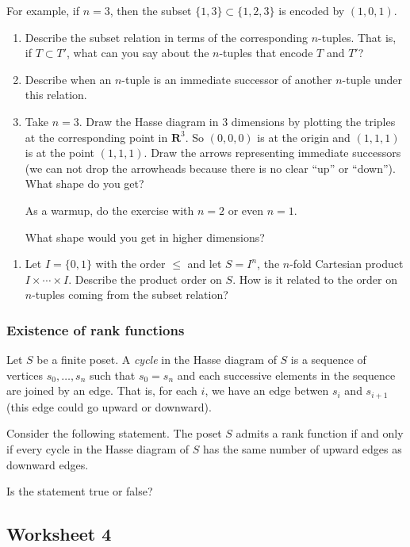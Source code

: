 \documentclass{amsart}
\begin{document}
For example, if \(n = 3\), then the subset \(\{1,3\} \subset \{1,2,3\}\) is encoded by \((1,0,1)\).

\begin{enumerate}
\item Describe the subset relation in terms of the corresponding \(n\)-tuples.
That is, if \(T \subset T'\), what can you say about the \(n\)-tuples that encode \(T\) and \(T'\)?

\item Describe when an \(n\)-tuple is an immediate successor of another \(n\)-tuple under this relation.

\item Take \(n = 3\).
Draw the Hasse diagram in 3 dimensions by plotting the triples at the corresponding point in \(\mathbf{R}^3\).
So \((0,0,0)\) is at the origin and \((1,1,1)\) is at the point \((1,1,1)\).
Draw the arrows representing immediate successors (we can not drop the arrowheads because there is no clear ``up'' or ``down'').
What shape do you get?

As a warmup, do the exercise with \(n = 2\) or even \(n = 1\).

What shape would you get in higher dimensions?
\end{enumerate}

\begin{enumerate}
\item Let \(I = \{0,1\}\) with the order \(\leq\) and let \(S = I^n\), the \(n\)-fold Cartesian product \(I \times \cdots \times I\).
Describe the product order on \(S\).
How is it related to the order on \(n\)-tuples coming from the subset relation?
\end{enumerate}
\subsubsection{Existence of rank functions}
\label{sec:orgb3ad547}
Let \(S\) be a finite poset.
A \emph{cycle} in the Hasse diagram of \(S\) is a sequence of vertices \(s_0, \dots, s_{n}\)  such that \(s_0 = s_n\) and each successive elements in the sequence are joined by an edge.
That is, for each \(i\), we have an edge betwen \(s_i\) and \(s_{i+1}\) (this edge could go upward or downward).

Consider the following statement.
The poset \(S\) admits a rank function if and only if every cycle in the Hasse diagram of \(S\) has the same number of upward edges as downward edges.

Is the statement true or false?
\subsection{Worksheet 4}
\label{sec:orgc32850e}
\togglefalse{solutions}
\end{document}
